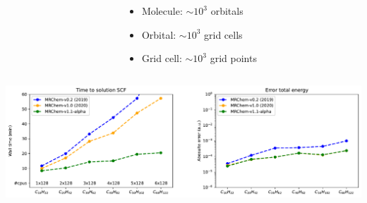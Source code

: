 \begin{frame}
\begin{columns}
\begin{column}[b]{0.5\linewidth}
\vspace{0mm}

\end{column}

\begin{column}[b]{0.35\linewidth}

\begin{itemize}
    \item Molecule: $\sim 10^3$ orbitals
    \item Orbital: $\sim 10^3$ grid cells
    \item Grid cell: $\sim 10^3$ grid points
\end{itemize}

\vspace{2mm}

\end{column}
\end{columns}

\vspace{8mm}

\includegraphics[scale=0.38]{figures/weak_scaling.pdf}

\end{frame}


